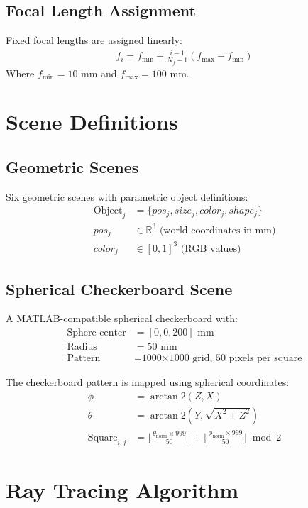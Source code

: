 \documentclass[11pt]{article}
\begin{document}
\subsection{Focal Length Assignment}
Fixed focal lengths are assigned linearly:
\begin{align}
f_i = f_{\min} + \frac{i-1}{N_f-1}(f_{\max} - f_{\min})
\end{align}
Where $f_{\min} = 10$ mm and $f_{\max} = 100$ mm.

\section{Scene Definitions}

\subsection{Geometric Scenes}
Six geometric scenes with parametric object definitions:
\begin{align}
\text{Object}_j &= \{pos_j, size_j, color_j, shape_j\} \\
pos_j &\in \mathbb{R}^3 \text{ (world coordinates in mm)} \\
color_j &\in [0,1]^3 \text{ (RGB values)}
\end{align}

\subsection{Spherical Checkerboard Scene}
A MATLAB-compatible spherical checkerboard with:
\begin{align}
\text{Sphere center} &= [0, 0, 200] \text{ mm} \\
\text{Radius} &= 50 \text{ mm} \\
\text{Pattern} &= \text{1000×1000 grid, 50 pixels per square}
\end{align}

The checkerboard pattern is mapped using spherical coordinates:
\begin{align}
\phi &= \arctan2(Z, X) \\
\theta &= \arctan2(Y, \sqrt{X^2 + Z^2}) \\
\text{Square}_{i,j} &= \lfloor\frac{\theta_{\text{norm}} \times 999}{50}\rfloor + \lfloor\frac{\phi_{\text{norm}} \times 999}{50}\rfloor \bmod 2
\end{align}

\section{Ray Tracing Algorithm}
\end{document}
